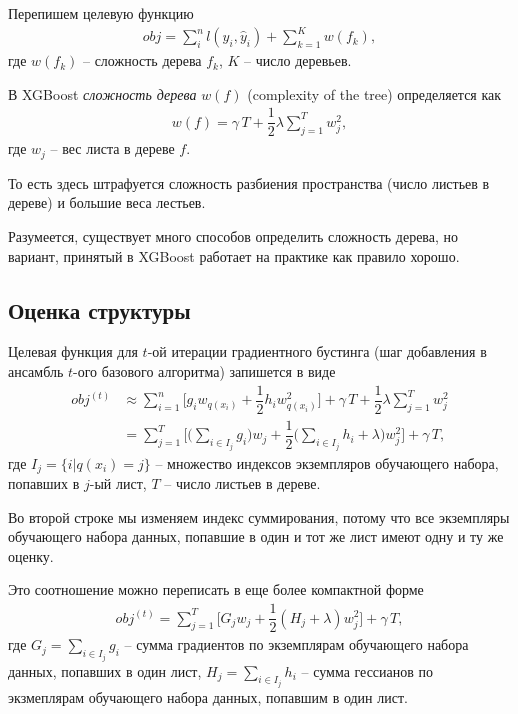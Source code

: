 \documentclass[%
	11pt,
	a4paper,
	utf8,
		]{article}
\begin{document}
Перепишем целевую функцию
\begin{align*}
	obj = \sum_i^n l(y_i, \hat{y}_i) +\sum_{k=1}^K w(f_k),
\end{align*}
где $ w(f_k) $ -- сложность дерева $ f_k $, $ K $ -- число деревьев.

В XGBoost \emph{сложность дерева} $ w(f) $ (complexity of the tree) определяется как
\begin{align*}
	w(f) = \gamma \, T + \dfrac{1}{2} \lambda \sum_{j=1}^{T} w_j^2,
\end{align*}
где $ w_j $ -- вес листа в дереве $ f $.

То есть здесь штрафуется сложность разбиения пространства (число листьев в дереве) и большие веса лестьев.

Разумеется, существует много способов определить сложность дерева, но вариант, принятый в XGBoost работает на практике как правило хорошо.

\subsection{Оценка структуры}

Целевая функция для $ t $-ой итерации градиентного бустинга (шаг добавления в ансамбль $ t $-ого базового алгоритма) запишется в виде
\begin{align*}
	obj^{(t)} &\approx \sum_{i=1}^n \Big[ g_i w_{ q(x_i) } + \dfrac{1}{2}h_i w_{ q(x_i) }^2 \Big] + \gamma \, T + \dfrac{1}{2} \lambda \sum_{j=1}^T w_j^2 \\
	 &= \sum_{j=1}^T \Big[ \Big( \sum_{ i \in I_j } g_i \Big) w_j + \dfrac{1}{2} \Big( \sum_{i \in I_j} h_i +\lambda \Big) w_j^2 \Big] + \gamma \, T,
\end{align*}
где $ I_j = \{ i | q(x_i) = j \} $ -- множество индексов экземпляров обучающего набора, попавших в $ j $-ый лист, $ T $ -- число листьев в дереве.

Во второй строке мы изменяем индекс суммирования, потому что все экземпляры обучающего набора данных, попавшие в один и тот же лист имеют одну и ту же оценку.

Это соотношение можно переписать в еще более компактной форме
\begin{align*}
	obj^{(t)} = \sum_{j=1}^T \Big[ G_j w_j + \dfrac{1}{2} (H_j + \lambda)w_j^2 \Big] + \gamma \, T,
\end{align*}
где $ G_j = \sum_{i \in I_j} g_i $ -- сумма градиентов по экземплярам обучающего набора данных, попавших в один лист, $ H_j = \sum_{ i \in I_j } h_i $ -- сумма гессианов по экзмеплярам обучающего набора данных, попавшим в один лист.
\end{document}
